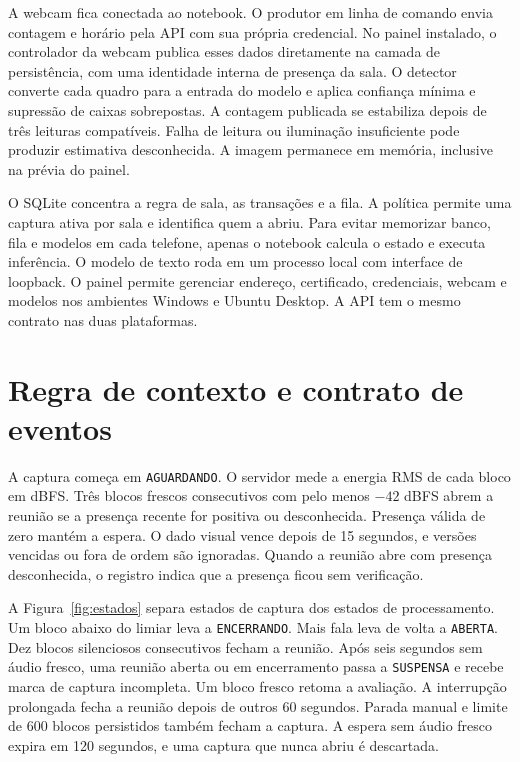 \documentclass[12pt]{article}
\newcommand{\state}[1]{\texttt{#1}}
\begin{document}
A webcam fica conectada ao notebook. O produtor em linha de comando envia contagem e horário pela API com sua própria credencial. No painel instalado, o controlador da webcam publica esses dados diretamente na camada de persistência, com uma identidade interna de presença da sala. O detector converte cada quadro para a entrada do modelo e aplica confiança mínima e supressão de caixas sobrepostas. A contagem publicada se estabiliza depois de três leituras compatíveis. Falha de leitura ou iluminação insuficiente pode produzir estimativa desconhecida. A imagem permanece em memória, inclusive na prévia do painel.

O SQLite concentra a regra de sala, as transações e a fila. A política permite uma captura ativa por sala e identifica quem a abriu. Para evitar memorizar banco, fila e modelos em cada telefone, apenas o notebook calcula o estado e executa inferência. O modelo de texto roda em um processo local com interface de loopback. O painel permite gerenciar endereço, certificado, credenciais, webcam e modelos nos ambientes Windows e Ubuntu Desktop. A API tem o mesmo contrato nas duas plataformas.

\section{Regra de contexto e contrato de eventos}

A captura começa em \state{AGUARDANDO}. O servidor mede a energia RMS de cada bloco em dBFS. Três blocos frescos consecutivos com pelo menos $-42$ dBFS abrem a reunião se a presença recente for positiva ou desconhecida. Presença válida de zero mantém a espera. O dado visual vence depois de 15 segundos, e versões vencidas ou fora de ordem são ignoradas. Quando a reunião abre com presença desconhecida, o registro indica que a presença ficou sem verificação.

A Figura~\ref{fig:estados} separa estados de captura dos estados de processamento. Um bloco abaixo do limiar leva a \state{ENCERRANDO}. Mais fala leva de volta a \state{ABERTA}. Dez blocos silenciosos consecutivos fecham a reunião. Após seis segundos sem áudio fresco, uma reunião aberta ou em encerramento passa a \state{SUSPENSA} e recebe marca de captura incompleta. Um bloco fresco retoma a avaliação. A interrupção prolongada fecha a reunião depois de outros 60 segundos. Parada manual e limite de 600 blocos persistidos também fecham a captura. A espera sem áudio fresco expira em 120 segundos, e uma captura que nunca abriu é descartada.
\end{document}
